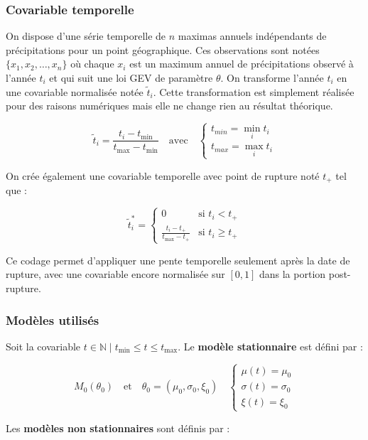 \documentclass[
  article,
  nofooter,
  noheadings]{jss}
\begin{document}
\subsubsection{Covariable temporelle}\label{covariable-temporelle}

On dispose d'une série temporelle de \(n\) maximas annuels indépendants
de précipitations pour un point géographique. Ces observations sont
notées \(\{x_1, x_2, \dots, x_n\}\) où chaque \(x_i\) est un maximum
annuel de précipitations observé à l'année \(t_i\) et qui suit une loi
GEV de paramètre \(\theta\). On transforme l'année \(t_i\) en une
covariable normalisée notée \(\tilde{t}_i\). Cette transformation est
simplement réalisée pour des raisons numériques mais elle ne change rien
au résultat théorique.

\[
\tilde{t}_i = \frac{t_i - t_{\min}}{t_{\max} - t_{\min}} \quad \text{avec} \quad \begin{cases}
t_{min} = \min_i t_i \\
t_{max} = \max_i t_i
\end{cases}
\]

On crée également une covariable temporelle avec point de rupture noté
\(t_+\) tel que :

\[
\tilde{t}_{i}^\ast =
\begin{cases}
0 & \text{si } t_i < t_+ \\
\displaystyle \frac{t_i - t_+}{t_{\max} - t_+} & \text{si } t_i \ge t_+
\end{cases}
\]

Ce codage permet d'appliquer une pente temporelle seulement après la
date de rupture, avec une covariable encore normalisée sur \([0,1]\)
dans la portion post-rupture.

\subsubsection{Modèles utilisés}\label{moduxe8les-utilisuxe9s}

Soit la covariable
\(t \in \mathbb{N} \mid t_{\min} \leq t \leq t_{\max}\). Le
\textbf{modèle stationnaire} est défini par :

\[
M_0(\theta_0) \quad \text{et} \quad \theta_0 = (\mu_0, \sigma_0, \xi_0) \quad
\begin{cases}
\mu(t) = \mu_0 \\
\sigma(t) = \sigma_0 \\
\xi(t) = \xi_0
\end{cases}
\]

Les \textbf{modèles non stationnaires} sont définis par :
\end{document}
